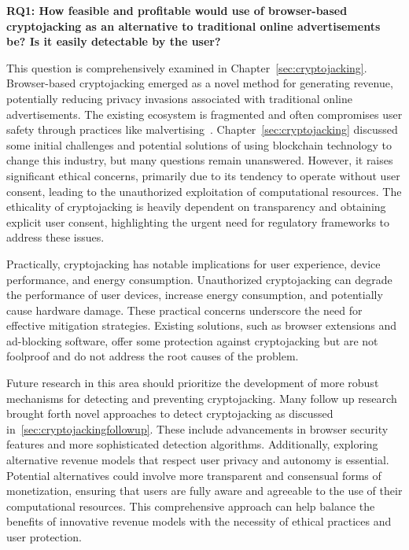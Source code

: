\textbf{RQ1: How feasible and profitable would use of browser-based cryptojacking as an alternative to traditional online advertisements be? Is it easily detectable by the user?}

This question is comprehensively examined in Chapter~\ref{sec:cryptojacking}. Browser-based cryptojacking emerged as a novel method for generating revenue, potentially reducing privacy invasions associated with traditional online advertisements. The existing ecosystem is fragmented and often compromises user safety through practices like malvertising~\cite{li2012knowing}. Chapter~\ref{sec:cryptojacking} discussed some initial challenges and potential solutions of using blockchain technology to change this industry, but many questions remain unanswered. However, it raises significant ethical concerns, primarily due to its tendency to operate without user consent, leading to the unauthorized exploitation of computational resources. The ethicality of cryptojacking is heavily dependent on transparency and obtaining explicit user consent, highlighting the urgent need for regulatory frameworks to address these issues.

Practically, cryptojacking has notable implications for user experience, device performance, and energy consumption. Unauthorized cryptojacking can degrade the performance of user devices, increase energy consumption, and potentially cause hardware damage. These practical concerns underscore the need for effective mitigation strategies. Existing solutions, such as browser extensions and ad-blocking software, offer some protection against cryptojacking but are not foolproof and do not address the root causes of the problem.

Future research in this area should prioritize the development of more robust mechanisms for detecting and preventing cryptojacking. Many follow up research brought forth novel approaches to detect cryptojacking as discussed in~\ref{sec:cryptojackingfollowup}. These include advancements in browser security features and more sophisticated detection algorithms. Additionally, exploring alternative revenue models that respect user privacy and autonomy is essential. Potential alternatives could involve more transparent and consensual forms of monetization, ensuring that users are fully aware and agreeable to the use of their computational resources. This comprehensive approach can help balance the benefits of innovative revenue models with the necessity of ethical practices and user protection.



